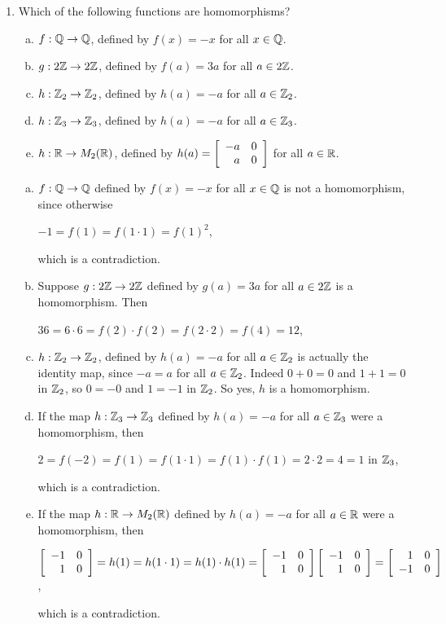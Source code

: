 \documentclass[11pt,fleqn,dvipsnames,usenames]{article}
\newcommand{\p}{\noindent}
\begin{document}
\p {\huge \S4.6 Problems}
\vsp

\begin{enumerate}
\item Which of the following functions are homomorphisms?
\begin{enumerate}[(a)]
\item $f:\Q\to\Q$, defined by $f(x) = -x$ for all $x\in \Q$.
\item $g:2\Z\to2\Z$, defined by $f(a) = 3a$ for all $a\in2\Z$.
\item $h:\Z_2\to\Z_2$, defined by $h(a) = -a$ for all $a\in\Z_2$.
\item $h:\Z_3\to\Z_3$, defined by $h(a) = -a$ for all $a\in\Z_3$.
\item $h:\R\to M_{2}(\R)$, defined by $h(a) = \MATRIX{rr}{-a & 0\\a & 0}$ for all $a\in\R$.
\end{enumerate}
\vsmsp

\solution
\begin{enumerate}[(a)]
\item $f:\Q\to\Q$ defined by $f(x) = -x$ for all $x\in\Q$ is not a homomorphism, since otherwise
\begin{center}
$-1 = f(1) = f(1\cdot 1) = f(1)^2$,
\end{center}
which is a contradiction.

\item Suppose $g:2\Z\to2\Z$ defined by $g(a) = 3a$ for all $a\in2\Z$ is a homomorphism.  Then
\begin{center}
$36 = 6\cdot 6 = f(2)\cdot f(2) = f(2\cdot 2) = f(4) = 12$,
\end{center}

\item $h:\Z_2\to\Z_2$, defined by $h(a) = -a$ for all $a\in\Z_2$ is actually the identity map, since $-a = a$ for all $a\in\Z_{2}$.  Indeed $0+0 = 0$ and $1 + 1 = 0$ in $\Z_{2}$, so $0 = -0$ and $1 = -1$ in $\Z_{2}$.  So yes, $h$ is a homomorphism.

\item If the map $h:\Z_3\to\Z_3$ defined by $h(a) = -a$ for all $a\in\Z_3$ were a homomorphism, then
\begin{center}
$2 = f(-2) = f(1) = f(1\cdot 1) = f(1)\cdot f(1) = 2\cdot 2 = 4 = 1$ in $\Z_{3}$,
\end{center}
which is a contradiction.

\item If the map $h:\R\to M_{2}(\R)$ defined by $h(a) = -a$ for all $a\in\R$ were a homomorphism, then
\begin{center}
$\MATRIX{rr}{-1 & 0\\1 & 0} = h(1) = h(1\cdot 1) = h(1)\cdot h(1) = \MATRIX{rr}{-1 & 0\\1 & 0}\MATRIX{rr}{-1 & 0\\1 & 0} = \MATRIX{rr}{1 & 0\\-1 & 0}$,
\end{center}
which is a contradiction.
\end{enumerate}


\end{enumerate}
\end{document}
